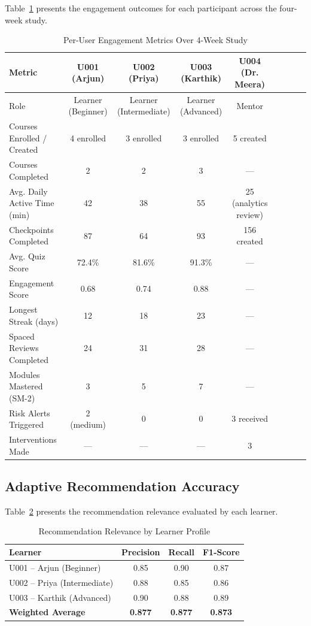 \documentclass[conference]{IEEEtran}
\begin{document}
Table~\ref{tab:user_results} presents the engagement outcomes for each participant across the four-week study.

\begin{table}[htbp]
\caption{Per-User Engagement Metrics Over 4-Week Study}
\label{tab:user_results}
\centering
\begin{tabular}{p{2.2cm}cccccccc}
\toprule
\textbf{Metric} & \textbf{U001 (Arjun)} & \textbf{U002 (Priya)} & \textbf{U003 (Karthik)} & \textbf{U004 (Dr. Meera)} \\
\midrule
Role & Learner (Beginner) & Learner (Intermediate) & Learner (Advanced) & Mentor \\
Courses Enrolled / Created & 4 enrolled & 3 enrolled & 3 enrolled & 5 created \\
Courses Completed & 2 & 2 & 3 & --- \\
Avg. Daily Active Time (min) & 42 & 38 & 55 & 25 (analytics review) \\
Checkpoints Completed & 87 & 64 & 93 & 156 created \\
Avg. Quiz Score & 72.4\% & 81.6\% & 91.3\% & --- \\
Engagement Score & 0.68 & 0.74 & 0.88 & --- \\
Longest Streak (days) & 12 & 18 & 23 & --- \\
Spaced Reviews Completed & 24 & 31 & 28 & --- \\
Modules Mastered (SM-2) & 3 & 5 & 7 & --- \\
Risk Alerts Triggered & 2 (medium) & 0 & 0 & 3 received \\
Interventions Made & --- & --- & --- & 3 \\
\bottomrule
\end{tabular}
\end{table}

\subsection{Adaptive Recommendation Accuracy}

Table~\ref{tab:recommendation} presents the recommendation relevance evaluated by each learner.

\begin{table}[htbp]
\caption{Recommendation Relevance by Learner Profile}
\label{tab:recommendation}
\centering
\begin{tabular}{lccc}
\toprule
\textbf{Learner} & \textbf{Precision} & \textbf{Recall} & \textbf{F1-Score} \\
\midrule
U001 -- Arjun (Beginner) & 0.85 & 0.90 & 0.87 \\
U002 -- Priya (Intermediate) & 0.88 & 0.85 & 0.86 \\
U003 -- Karthik (Advanced) & 0.90 & 0.88 & 0.89 \\
\midrule
\textbf{Weighted Average} & \textbf{0.877} & \textbf{0.877} & \textbf{0.873} \\
\bottomrule
\end{tabular}
\end{table}
\end{document}
